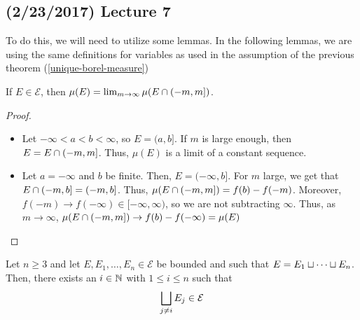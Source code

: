 \documentclass[11pt,leqno,oneside]{amsbook}
\numberwithin{thm}{section}
\newcommand{\Ep}{\mathcal{E}}
\begin{document}
\subsection*{(2/23/2017) Lecture 7}
To do this, we will need to utilize some lemmas. In the following
lemmas, we are using the same definitions for variables as used in the
assumption of the previous theorem (\ref{unique-borel-measure})
\begin{lem}\label{lebesgue-lem-1}
  If $E \in \Ep$, then $\mu(E) = \lim_{m \to \infty} \mu(E \cap (-m,m])$.
\end{lem}
\begin{proof}
  \begin{itemize}
  \item Let $-\infty < a < b < \infty$, so $E = (a,b]$. If $m$ is
    large enough, then $E = E \cap (-m,m]$. Thus, $\mu(E)$ is a
    limit of a constant sequence.
  \item Let $a = -\infty$ and $b$ be finite. Then, $E =
    (-\infty,b]$. For $m$ large, we get that $E \cap (-m,b] =
    (-m,b]$. Thus, $\mu(E \cap (-m,m]) = f(b) -
    f(-m)$. Moreover, $f(-m) \to f(-\infty) \in [-\infty,\infty)$, so
    we are not subtracting $\infty$. Thus, as $m \to \infty$, $\mu(E
    \cap (-m,m]) \to f(b) - f(-\infty) = \mu(E)$
  \end{itemize}
\end{proof}
\begin{lem}\label{lebesgue-lem-2}
  Let $n \geq 3$ and let $E,E_1, \ldots, E_n \in \Ep$ be bounded and
  such that $E = E_1 \sqcup \cdots \sqcup E_n$. Then, there exists
  an $i \in {\mathbb N}$ with $1 \leq i \leq n$ such that \[
    \Dunion_{j \neq i} E_j \in \Ep
  \]
\end{lem}
\end{document}
